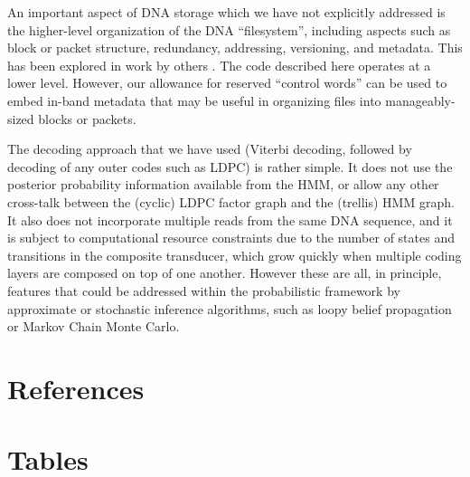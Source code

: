 \documentclass[english]{article}
\begin{document}
An important aspect of DNA storage which we have not explicitly addressed
is the higher-level organization of the DNA ``filesystem'',
including aspects such as block or packet structure, redundancy, addressing,
versioning, and metadata.
This has been explored in work by others \cite{YazdiEtAl2015,BornholtEtAl2016}.
The code described here operates at a lower level.
However, our allowance for reserved ``control words''
can be used to embed in-band metadata that may be useful in organizing files into manageably-sized blocks or packets.

The decoding approach that we have used (Viterbi decoding, followed by decoding of any outer codes such as LDPC) is rather simple.
It does not use the posterior probability information available from the HMM, or allow any other cross-talk between the (cyclic) LDPC factor graph and the (trellis) HMM graph.
It also does not incorporate multiple reads from the same DNA sequence,
and it is subject to computational resource constraints due to the number of states and transitions in the composite transducer,
which grow quickly when multiple coding layers are composed on top of one another.
However these are all, in principle, features that could be addressed within the probabilistic framework by approximate or stochastic inference algorithms,
such as loopy belief propagation or Markov Chain Monte Carlo.



\newpage
\section{References}


\newpage
\section{Tables}
\end{document}
